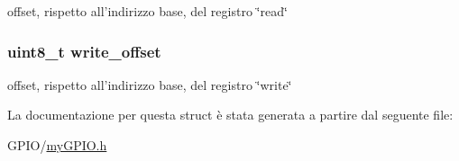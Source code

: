 offset, rispetto all'indirizzo base, del registro \char`\"{}read\char`\"{} \hypertarget{structmy_g_p_i_o__t_abb65e5db6d4ad365a7c48d00e4af1f78}{
\subsubsection[{write\+\_\+offset}]{\setlength{\rightskip}{0pt plus 5cm}uint8\+\_\+t write\+\_\+offset}}\label{structmy_g_p_i_o__t_abb65e5db6d4ad365a7c48d00e4af1f78}
offset, rispetto all'indirizzo base, del registro \char`\"{}write\char`\"{} 

La documentazione per questa struct è stata generata a partire dal seguente file\+:\begin{DoxyCompactItemize}
\item 
G\+P\+I\+O/\hyperlink{my_g_p_i_o_8h}{my\+G\+P\+I\+O.\+h}\end{DoxyCompactItemize}
